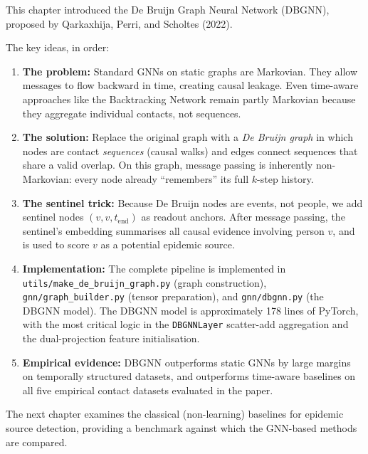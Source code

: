 This chapter introduced the De Bruijn Graph Neural Network (DBGNN), proposed by Qarkaxhija,
Perri, and Scholtes (2022).

The key ideas, in order:

\begin{enumerate}
    \item \textbf{The problem:} Standard GNNs on static graphs are Markovian. They allow
          messages to flow backward in time, creating causal leakage. Even time-aware approaches
          like the Backtracking Network remain partly Markovian because they aggregate
          individual contacts, not sequences.

    \item \textbf{The solution:} Replace the original graph with a \emph{De Bruijn graph} in
          which nodes are contact \emph{sequences} (causal walks) and edges connect sequences
          that share a valid overlap. On this graph, message passing is inherently
          non-Markovian: every node already ``remembers'' its full $k$-step history.

    \item \textbf{The sentinel trick:} Because De Bruijn nodes are events, not people, we add
          sentinel nodes $(v, v, t_{\text{end}})$ as readout anchors. After message passing,
          the sentinel's embedding summarises all causal evidence involving person $v$, and is
          used to score $v$ as a potential epidemic source.

    \item \textbf{Implementation:} The complete pipeline is implemented in
          \texttt{utils/make\_de\_bruijn\_graph.py} (graph construction),
          \texttt{gnn/graph\_builder.py} (tensor preparation), and
          \texttt{gnn/dbgnn.py} (the DBGNN model). The DBGNN model is approximately 178 lines
          of PyTorch, with the most critical logic in the \texttt{DBGNNLayer} scatter-add
          aggregation and the dual-projection feature initialisation.

    \item \textbf{Empirical evidence:} DBGNN outperforms static GNNs by large margins on
          temporally structured datasets, and outperforms time-aware baselines on all five
          empirical contact datasets evaluated in the paper.
\end{enumerate}

The next chapter examines the classical (non-learning) baselines for epidemic source detection,
providing a benchmark against which the GNN-based methods are compared.
